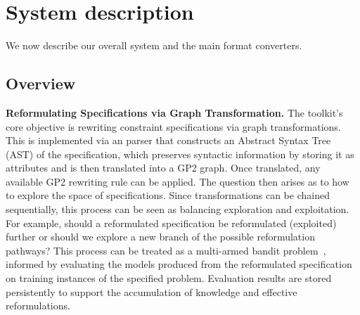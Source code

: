

\section{System description}

We now describe our overall system and the main format converters.

\subsection{Overview}

\noindent\textbf{Reformulating \essence Specifications via Graph Transformation.} The toolkit's core objective is rewriting \essence constraint specifications via graph transformations. This is implemented via an \essence parser that constructs an Abstract Syntax Tree (AST) of the specification, which preserves syntactic information by storing it as attributes and is then translated into a GP2 graph. Once translated, any available GP2 rewriting rule can be applied. The question then arises as to how to explore the space of \essence specifications. Since transformations can be chained sequentially, this process can be seen as balancing exploration and exploitation. For example, should a reformulated specification be reformulated (exploited) further or should we explore a new branch of the possible reformulation pathways?
This process can be treated as a multi-armed bandit problem~\cite{bandits-book}, informed by evaluating the models produced from the reformulated specification on training instances of the specified problem. Evaluation results are stored persistently to support the accumulation of knowledge and effective reformulations. 


